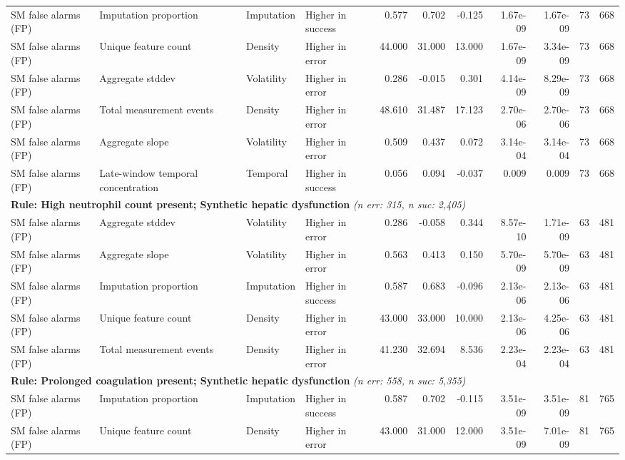 \documentclass[border=0pt]{standalone}
\begin{document}
\begin{adjustbox}{width=\textwidth}
\begin{tabular}{@{}llllrrrrrrr@{}}
SM false alarms (FP) & Imputation proportion & Imputation & Higher in success & 0.577 & 0.702 & -0.125 & 1.67e-09 & 1.67e-09 & 73 & 668 \\
SM false alarms (FP) & Unique feature count & Density & Higher in error & 44.000 & 31.000 & 13.000 & 1.67e-09 & 3.34e-09 & 73 & 668 \\
SM false alarms (FP) & Aggregate stddev & Volatility & Higher in error & 0.286 & -0.015 & 0.301 & 4.14e-09 & 8.29e-09 & 73 & 668 \\
SM false alarms (FP) & Total measurement events & Density & Higher in error & 48.610 & 31.487 & 17.123 & 2.70e-06 & 2.70e-06 & 73 & 668 \\
SM false alarms (FP) & Aggregate slope & Volatility & Higher in error & 0.509 & 0.437 & 0.072 & 3.14e-04 & 3.14e-04 & 73 & 668 \\
SM false alarms (FP) & Late-window temporal concentration & Temporal & Higher in success & 0.056 & 0.094 & -0.037 & 0.009 & 0.009 & 73 & 668 \\
\multicolumn{11}{l}{\textbf{Rule: High neutrophil count present; Synthetic hepatic dysfunction} \textit{(n err: 315, n suc: 2,405)}} \\
SM false alarms (FP) & Aggregate stddev & Volatility & Higher in error & 0.286 & -0.058 & 0.344 & 8.57e-10 & 1.71e-09 & 63 & 481 \\
SM false alarms (FP) & Aggregate slope & Volatility & Higher in error & 0.563 & 0.413 & 0.150 & 5.70e-09 & 5.70e-09 & 63 & 481 \\
SM false alarms (FP) & Imputation proportion & Imputation & Higher in success & 0.587 & 0.683 & -0.096 & 2.13e-06 & 2.13e-06 & 63 & 481 \\
SM false alarms (FP) & Unique feature count & Density & Higher in error & 43.000 & 33.000 & 10.000 & 2.13e-06 & 4.25e-06 & 63 & 481 \\
SM false alarms (FP) & Total measurement events & Density & Higher in error & 41.230 & 32.694 & 8.536 & 2.23e-04 & 2.23e-04 & 63 & 481 \\
\multicolumn{11}{l}{\textbf{Rule: Prolonged coagulation present; Synthetic hepatic dysfunction} \textit{(n err: 558, n suc: 5,355)}} \\
SM false alarms (FP) & Imputation proportion & Imputation & Higher in success & 0.587 & 0.702 & -0.115 & 3.51e-09 & 3.51e-09 & 81 & 765 \\
SM false alarms (FP) & Unique feature count & Density & Higher in error & 43.000 & 31.000 & 12.000 & 3.51e-09 & 7.01e-09 & 81 & 765 \\

\end{tabular}
\end{adjustbox}
\end{document}
